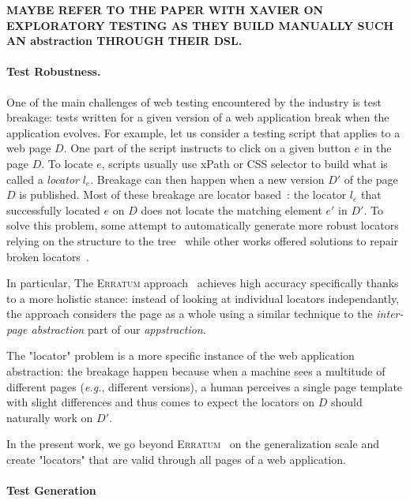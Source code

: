 \documentclass[sigconf,authordraft]{acmart}
\theoremstyle{definition}
\begin{document}
\textbf{MAYBE REFER TO THE PAPER WITH XAVIER ON EXPLORATORY TESTING AS THEY BUILD MANUALLY SUCH AN abstraction THROUGH THEIR DSL.}

\paragraph{Test Robustness.}
One of the main challenges of web testing encountered by the industry is test breakage: tests written for a given version of a web application break when the application evolves.
For example, let us consider a testing script that applies to a web page $D$.
One part of the script instructs to click on a given button $e$ in the page $D$.
To locate $e$, scripts usually use xPath or CSS selector to build what is called a \emph{locator} $l_e$. 
Breakage can then happen when a new version $D'$ of the page $D$ is published.
Most of these breakage are locator based~\cite{Hammoudi2016WhyBreak}: the locator $l_e$ that successfully located $e$ on $D$ does not locate the matching element $e'$ in $D'$. 
To solve this problem, some attempt to automatically generate more robust locators relying on the structure to the tree~\cite{Leotta2016spanLocators, Leotta2021Sidereal:Testing, Yandrapally2014RobustClues, Bajaj2016SynthesizingLocators} while other works offered solutions to repair broken locators~\cite{Brisset2022Erratum:Scripts, Choudhary2011WATER:Repair, Kirinuki2019COLOR:Application}.

In particular, The \textsc{Erratum} approach~\cite{Brisset2022Erratum:Scripts} achieves high accuracy specifically thanks to a more holistic stance: instead of looking at individual locators independantly, the approach considers the page as a whole using a similar technique to the \emph{inter-page abstraction} part of our \emph{appstraction}.

The "locator" problem is a more specific instance of the web application abstraction: the breakage happen because when a machine sees a multitude of different pages (\emph{e.g.}, different versions), a human perceives a single page template with slight differences and thus comes to expect the locators on $D$ should naturally work on $D'$. 

In the present work, we go beyond \textsc{Erratum}~\cite{Brisset2022Erratum:Scripts} on the generalization scale and create "locators" that are valid through all pages of a web application.

\paragraph{Test Generation}
\end{document}
